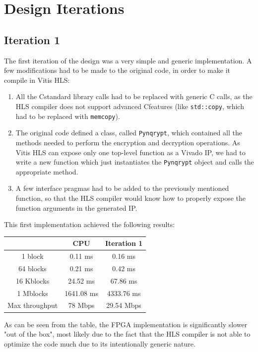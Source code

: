 \documentclass[12pt,oneside,a4paper]{article}
\def\CC{{C\nolinebreak[4]\hspace{-.05em}\raisebox{.4ex}{\tiny\bf ++}}}
\begin{document}
\section{Design Iterations} \label{sec:iterations}

\subsection{Iteration 1} \label{subsec:iter1}
The first iteration of the design was a very simple and generic implementation. A few modifications had to be made to the original code, in order to make it compile in Vitis HLS:
\begin{enumerate}
	\item All the \CC standard library calls had to be replaced with generic C calls, as the HLS compiler does not support advanced \CC features (like \texttt{std::copy}, which had to be replaced with \texttt{memcopy}).
	\item The original code defined a class, called \texttt{Pynqrypt}, which contained all the methods needed to perform the encryption and decryption operations. As Vitis HLS can expose only one top-level function as a Vivado IP, we had to write a new function which just instantiates the \texttt{Pynqrypt} object and calls the appropriate method.
	\item A few interface pragmas had to be added to the previously mentioned function, so that the HLS compiler would know how to properly expose the function arguments in the generated IP.
\end{enumerate}

This first implementation achieved the following results:
\begin{table}[h!]
	\centering
	\begin{tabular}{ccc}
		\toprule
		 & CPU & Iteration 1 \\
		\midrule
		1 block & 0.11 ms & 0.16 ms \\
		64 blocks & 0.21 ms & 0.42 ms \\
		16 Kblocks & 24.52 ms & 67.86 ms \\
		1 Mblocks & 1641.08 ms & 4333.76 ms \\
		Max throughput & 78 Mbps & 29.54 Mbps \\
		\bottomrule
	\end{tabular}
\end{table}

As can be seen from the table, the FPGA implementation is significantly slower "out of the box", most likely due to the fact that the HLS compiler is not able to optimize the code much due to its intentionally generic nature.
\end{document}
